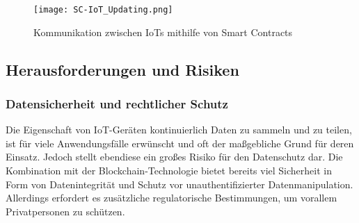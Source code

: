 \begin{figure}[!h]
    \begin{center}
        \texttt{[image: SC-IoT\_Updating.png]}
    \end{center}
    \caption{Kommunikation zwischen IoTs mithilfe von Smart Contracts}
    \label{fig:SC-IoT_Update}
\end{figure}









\subsection{Herausforderungen und Risiken}

\subsubsection{Datensicherheit und rechtlicher Schutz}
Die Eigenschaft von IoT-Geräten kontinuierlich Daten zu sammeln und zu teilen, ist für viele 
Anwendungsfälle erwünscht und oft der maßgebliche Grund für deren Einsatz. 
Jedoch stellt ebendiese ein großes Risiko für den Datenschutz dar. Die Kombination mit der 
Blockchain-Technologie bietet bereits viel Sicherheit in Form von Datenintegrität und Schutz vor 
unauthentifizierter Datenmanipulation. Allerdings erfordert es zusätzliche regulatorische Bestimmungen, 
um vorallem Privatpersonen zu schützen.

